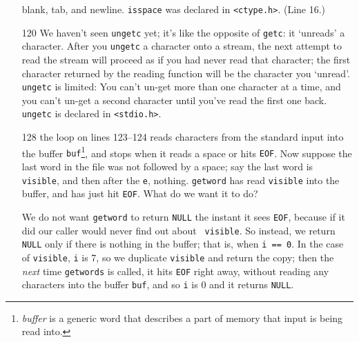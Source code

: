 \begin{itemize}
blank, tab, and newline.  {\tt isspace} was declared in {\tt <ctype.h>}.
(Line 16.)
\item[120] We haven't seen {\tt ungetc} yet; it's like the opposite of
{\tt getc}: it `unreads' a character. After you {\tt ungetc} a character
onto a stream, the next attempt to read the stream will proceed as if
you had never read that character; the first character returned by the
reading function will be the character you `unread'. {\tt ungetc} is
limited: You can't un-get more than one character at a time, and you
can't un-get a second character until you've read the first one back.
{\tt ungetc} is declared in {\tt <stdio.h>}.
\item[128] the loop on lines 123--124 reads characters from the standard
input into the buffer {\tt buf}\footnote{{\em buffer}\/ is a generic
word that describes a part of memory that input is being read into.},
and stops when it reads a space or hits {\tt EOF}.  Now suppose the last
word in the file was not followed by a space; say the last word is {\tt
visible}, and then after the {\tt e}, nothing.  {\tt getword} has 
read {\tt visible} into the buffer, and has just hit {\tt EOF}.  What do
we want it to do?  

We do not want {\tt getword} to return {\tt NULL} the instant it sees
{\tt EOF}, because if it did our caller would never find out about {\tt
visible}.  So instead, we return {\tt NULL} only if there is nothing in
the buffer; that is, when {\tt i == 0}.  In the case of {\tt visible},
{\tt i} is 7, so we duplicate {\tt visible} and return the copy; then
the {\em next}\/ time {\tt getwords} is called, it hits {\tt EOF} right
away, without reading any characters into the buffer {\tt buf}, and so
{\tt i} is 0 and it returns {\tt NULL}.  
\end{itemize} 

